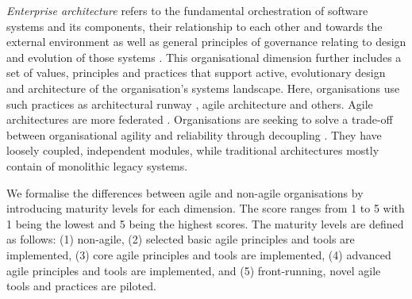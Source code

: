 \documentclass{article}
\newcommand{\myremark}[1]{{#1}}
\newcommand{\rmremark}[1]{\myremark{\color{red} [Ralf: #1]}}
\begin{document}
\textit{Enterprise architecture} refers to the fundamental orchestration of software systems and its components, their relationship to each other and towards the external environment as well as general principles of governance relating to design and evolution of those systems \cite{winter2006}. This organisational dimension further includes a set of values, principles and practices that support active, evolutionary design and architecture of the organisation's systems landscape. Here, organisations use such practices as architectural runway \cite{buchmann2012architectural}, agile architecture \cite{leffingwell2008principles} and others. Agile architectures are more federated \cite{leffingwell2008principles}. Organisations are seeking to solve a trade-off between organisational agility and reliability through decoupling \cite{Keller2019}. They have loosely coupled, independent modules, while traditional architectures mostly contain of monolithic legacy systems.

We formalise the differences between agile and non-agile organisations by introducing maturity levels for each dimension. The score ranges from 1 to 5 with 1 being the lowest and 5 being the highest scores. The maturity levels are defined as follows: (1) non-agile, (2) selected basic agile principles and tools are implemented, (3) core agile principles and tools are implemented, (4) advanced agile principles and tools are implemented, and (5) front-running, novel agile tools and practices are piloted.


\end{document}
